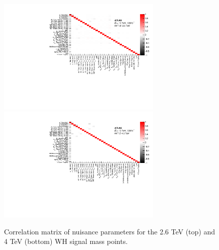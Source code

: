 \begin{figure}[htbp!]
    \begin{center}
        \includegraphics[width=0.7\textwidth]{CorrMatrix_UnconditionalMu_WH_2600.pdf} \\
        \includegraphics[width=0.7\textwidth]{CorrMatrix_UnconditionalMu_ZH_4000.pdf}
    \end{center}
    \caption{
        Correlation matrix of nuisance parameters for the 2.6 TeV (top) and 4 TeV (bottom) WH signal mass points.
    }
    \label{fig:corr_matrix_WH}
\end{figure}


